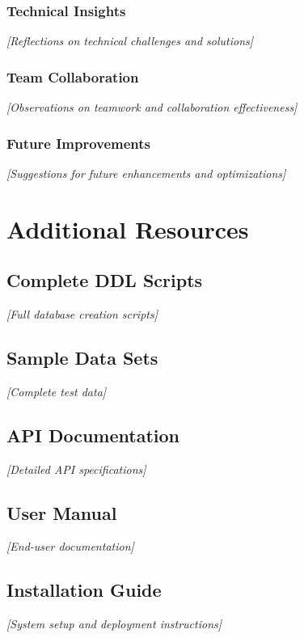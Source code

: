 \documentclass[12pt,a4paper,openany]{report}
\begin{document}
\subsection{Technical Insights}
\textit{[Reflections on technical challenges and solutions]}
\subsection{Team Collaboration}
\textit{[Observations on teamwork and collaboration effectiveness]}
\subsection{Future Improvements}
\textit{[Suggestions for future enhancements and optimizations]}
\newpage
\appendix
\chapter{Additional Resources}
\section{Complete DDL Scripts}
\textit{[Full database creation scripts]}
\section{Sample Data Sets}
\textit{[Complete test data]}
\section{API Documentation}
\textit{[Detailed API specifications]}
\section{User Manual}
\textit{[End-user documentation]}
\section{Installation Guide}
\textit{[System setup and deployment instructions]}
\end{document}

